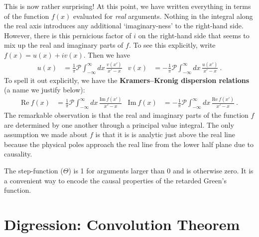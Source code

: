 This is now rather surprising! At this point, we have written everything in terms of the function $f(x)$ evaluated for \emph{real} arguments. Nothing in the integral along the real axis introduces any additional `imaginary-ness' to the right-hand side. However, there is this pernicious factor of $i$ on the right-hand side that seems to mix up the real and imaginary parts of $f$. To see this explicitly, write $f(x) = u(x) + i v(x)$. Then we have
\begin{align}
	u(x) &= \frac{1}{\pi}
	\mathcal P \int_{-\infty}^\infty dx 
		\, \frac{v(x')}{x'-x} 
		&
	v(x) &= -\frac{1}{\pi}
	\mathcal P \int_{-\infty}^\infty dx 
		\, \frac{u(x')}{x'-x} 
	\ .
\end{align}
To spell it out explicitly, we have the \textbf{Kramers--Kronig dispersion relations} (a name we justify below):
\begin{align}
	\text{Re}~f(x) &= \frac{1}{\pi}
	\mathcal P \int_{-\infty}^\infty dx 
		\, \frac{\text{Im}~f(x')}{x'-x} 
		&
	\text{Im}~f(x) &= -\frac{1}{\pi}
	\mathcal P \int_{-\infty}^\infty dx 
		\, \frac{\text{Re}~f(x')}{x'-x} 
	\ .
	\label{eq:KK:Cauchy:relations}
\end{align}
The remarkable observation is that the real and imaginary parts of the function $f$ are determined by one another through a principal value integral. The only assumption we made about $f$ is that it is is analytic just above the real line because the physical poles approach the real line from the lower half plane due to causality.

\begin{example}
The step-function ($\Theta$) is 1 for arguments larger than 0 and is otherwise zero. It is a convenient way to encode the causal properties of the retarded Green's function. 
\end{example}

\section{Digression: Convolution Theorem}
\label{sec:convolution:theorem}

